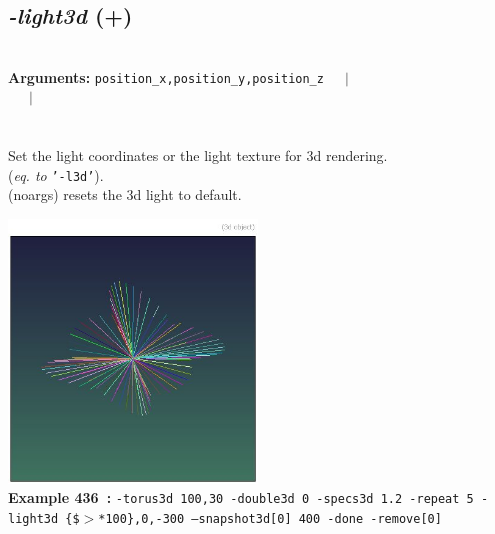 \documentclass[a4paper,11pt,twoside]{book}
\begin{document}
\subsection{\emph{-light3d} (+)}\vspace*{-0.5em}
~\\\textbf{Arguments: } 
{\small \texttt{position\_x,position\_y,position\_z}}~~~$|$\\
\hspace*{2.2cm}{\small \texttt{[texture]}}~~~$|$\\
\\~\\
Set the light coordinates or the light texture for 3d rendering.
~\\(\emph{eq. to} {\small \texttt{'-l3d'}}).
~\\(noargs) resets the 3d light to default.
\begin{center}\includegraphics[keepaspectratio=true,height=7cm,width=\textwidth]{img/gmic_def436.jpg}\\
{\footnotesize \textbf{Example 436~:} \texttt{-torus3d 100,30 -double3d 0 -specs3d 1.2 -repeat 5 -light3d \{\$$>$*100\},0,-300 --snapshot3d[0] 400 -done -remove[0]}}
\end{center}
\end{document}
